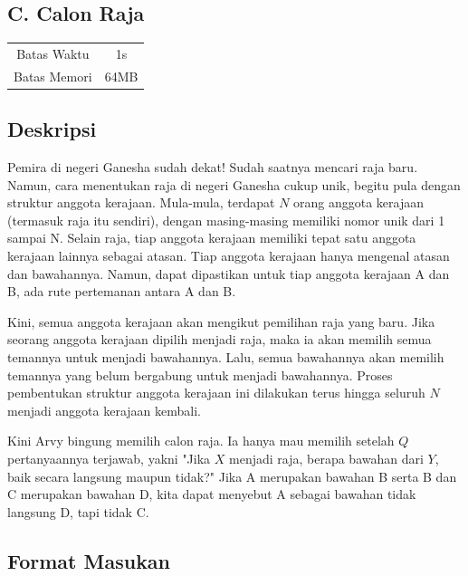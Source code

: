 \documentclass{article}
\begin{document}
\begin{center}
    \section*{C. Calon Raja} %

    \begin{tabular}{ | c c | }
        \hline
        Batas Waktu  & 1s \\    %
        Batas Memori & 64MB \\  %
        \hline
    \end{tabular}
\end{center}

\subsection*{Deskripsi}

Pemira di negeri Ganesha sudah dekat!
Sudah saatnya mencari raja baru.
Namun, cara menentukan raja di negeri Ganesha cukup unik, begitu pula dengan struktur anggota kerajaan.
Mula-mula, terdapat $N$ orang anggota kerajaan (termasuk raja itu sendiri), dengan masing-masing memiliki nomor unik dari 1 sampai N.
Selain raja, tiap anggota kerajaan memiliki tepat satu anggota kerajaan lainnya sebagai atasan.
Tiap anggota kerajaan hanya mengenal atasan dan bawahannya.
Namun, dapat dipastikan untuk tiap anggota kerajaan A dan B, ada rute pertemanan antara A dan B.

Kini, semua anggota kerajaan akan mengikut pemilihan raja yang baru.
Jika seorang anggota kerajaan dipilih menjadi raja, maka ia akan memilih semua temannya untuk menjadi bawahannya.
Lalu, semua bawahannya akan memilih temannya yang belum bergabung untuk menjadi bawahannya.
Proses pembentukan struktur anggota kerajaan ini dilakukan terus hingga seluruh $N$ menjadi anggota kerajaan kembali.

Kini Arvy bingung memilih calon raja.
Ia hanya mau memilih setelah $Q$ pertanyaannya terjawab, yakni "Jika $X$ menjadi raja, berapa bawahan dari $Y$, baik secara langsung maupun tidak?"
Jika A merupakan bawahan B serta B dan C merupakan bawahan D, kita dapat menyebut A sebagai bawahan tidak langsung D, tapi tidak C.

\subsection*{Format Masukan}
\end{document}
